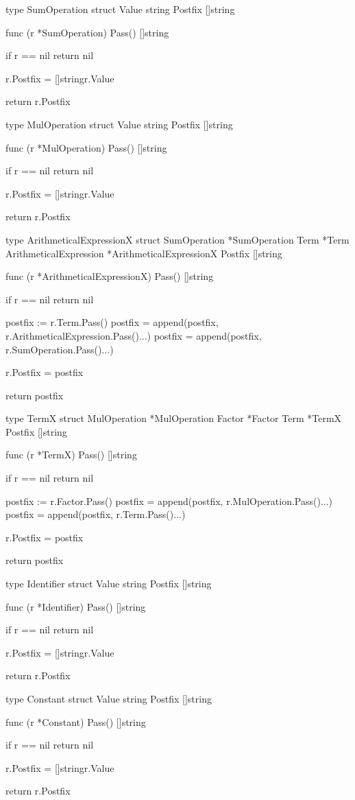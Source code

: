 type SumOperation struct {
	Value   string
	Postfix []string
}

func (r *SumOperation) Pass() []string {
	if r == nil {
		return nil
	}

	r.Postfix = []string{r.Value}

	return r.Postfix
}

type MulOperation struct {
	Value   string
	Postfix []string
}

func (r *MulOperation) Pass() []string {
	if r == nil {
		return nil
	}

	r.Postfix = []string{r.Value}

	return r.Postfix
}

type ArithmeticalExpressionX struct {
	SumOperation           *SumOperation
	Term                   *Term
	ArithmeticalExpression *ArithmeticalExpressionX
	Postfix                []string
}

func (r *ArithmeticalExpressionX) Pass() []string {
	if r == nil {
		return nil
	}

	postfix := r.Term.Pass()
	postfix = append(postfix, r.ArithmeticalExpression.Pass()...)
	postfix = append(postfix, r.SumOperation.Pass()...)

	r.Postfix = postfix

	return postfix
}

type TermX struct {
	MulOperation *MulOperation
	Factor       *Factor
	Term         *TermX
	Postfix      []string
}

func (r *TermX) Pass() []string {
	if r == nil {
		return nil
	}

	postfix := r.Factor.Pass()
	postfix = append(postfix, r.MulOperation.Pass()...)
	postfix = append(postfix, r.Term.Pass()...)

	r.Postfix = postfix

	return postfix
}

type Identifier struct {
	Value   string
	Postfix []string
}

func (r *Identifier) Pass() []string {
	if r == nil {
		return nil
	}

	r.Postfix = []string{r.Value}

	return r.Postfix
}

type Constant struct {
	Value   string
	Postfix []string
}

func (r *Constant) Pass() []string {
	if r == nil {
		return nil
	}

	r.Postfix = []string{r.Value}

	return r.Postfix
}